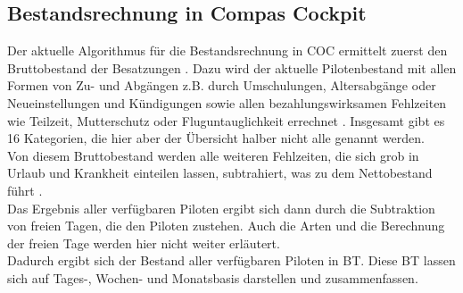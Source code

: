 \documentclass [12pt, a4paper, oneside, titlepage, ngerman]{article}
\begin{document}
\subsection{Bestandsrechnung in Compas Cockpit}
Der aktuelle Algorithmus für die Bestandsrechnung in \ac{COC} ermittelt zuerst den Bruttobestand der Besatzungen \cite[vgl.][S.8]{capfunc}. 
Dazu wird der aktuelle Pilotenbestand mit allen Formen von Zu- und Abgängen z.B. durch Umschulungen, Altersabgänge oder Neueinstellungen und Kündigungen sowie allen bezahlungswirksamen Fehlzeiten wie Teilzeit, Mutterschutz oder Fluguntauglichkeit errechnet \cite[vgl.][S.19]{benutzerhandbuch}. Insgesamt gibt es 16 Kategorien, die hier aber der Übersicht halber nicht alle genannt werden. \\
Von diesem Bruttobestand werden alle weiteren Fehlzeiten, die sich grob in Urlaub und Krankheit einteilen lassen, subtrahiert, was zu dem Nettobestand führt \cite[vgl.][S.8]{capfunc}. \\
Das Ergebnis aller verfügbaren Piloten ergibt sich dann durch die Subtraktion von freien Tagen, die den Piloten zustehen. Auch die Arten und die Berechnung der freien Tage werden hier nicht weiter erläutert. \\
Dadurch ergibt sich der Bestand aller verfügbaren Piloten in \ac{BT}. Diese \ac{BT} lassen sich auf Tages-, Wochen- und Monatsbasis darstellen und zusammenfassen.
\end{document}
